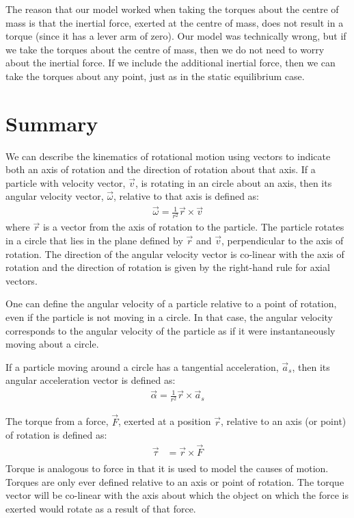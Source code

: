 The reason that our model worked when taking the torques about the centre of mass is that the inertial force, exerted at the centre of mass, does not result in a torque (since it has a lever arm of zero). Our model was technically wrong, but if we take the torques about the centre of mass, then we do not need to worry about the inertial force. If we include the additional inertial force, then we can take the torques about any point, just as in the static equilibrium case.

\newpage
\section{Summary}

\begin{chapterSummary}
We can describe the kinematics of rotational motion using vectors to indicate both an axis of rotation and the direction of rotation about that axis. If a particle with velocity vector, $\vec v$, is rotating in an circle about an axis, then its angular velocity vector, $\vec\omega$, relative to that axis is defined as:
\begin{align*}
\vec\omega = \frac{1}{r^2}\vec r \times \vec v
\end{align*}
where $\vec r$ is a vector from the axis of rotation to the particle. The particle rotates in a circle that lies in the plane defined by $\vec r$ and $\vec v$, perpendicular to the axis of rotation. The direction of the angular velocity vector is co-linear with the axis of rotation and the direction of rotation is given by the right-hand rule for axial vectors. 

One can define the angular velocity of a particle relative to a point of rotation, even if the particle is not moving in a circle. In that case, the angular velocity corresponds to the angular velocity of the particle as if it were instantaneously moving about a circle. 

If a particle moving around a circle has a tangential acceleration, $\vec a_s$, then its angular acceleration vector is defined as:
\begin{align*}
\vec\alpha = \frac{1}{r^2}\vec r \times \vec a_s
\end{align*}


The torque from a force, $\vec F$, exerted at a position $\vec r$, relative to an axis (or point) of rotation is defined as:
\begin{align*}
\vec\tau &= \vec r \times \vec F\\
\end{align*}
Torque is analogous to force in that it is used to model the causes of motion. Torques are only ever defined relative to an axis or point of rotation. The torque vector will be co-linear with the axis about which the object on which the force is exerted would rotate as a result of that force.


\end{chapterSummary}
